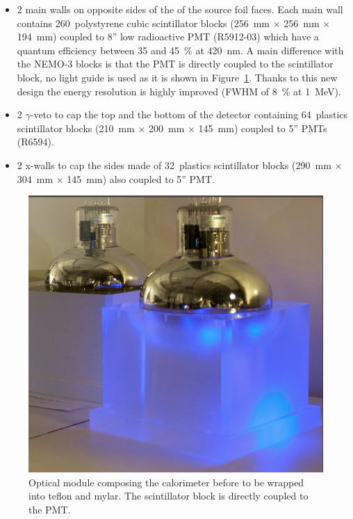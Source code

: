 \documentclass[main.tex]{subfiles}
\begin{document}
\begin{itemize}

\item 2 main walls on opposite sides of the of the source foil faces. Each main wall contains 260~polystyrene cubic scintillator  blocks (256~mm $\times$ 256~mm $\times$ 194~mm) coupled to 8'' low radioactive PMT (R5912-03) which have a quantum efficiency between 35 and 45~\% at 420~nm. A main difference with the NEMO-3 blocks is that the PMT is directly coupled to the scintillator block, no light guide is used as it is shown in Figure~\ref{SnemoOpticalModule}. Thanks to this new design the energy resolution is highly improved (FWHM of 8~\% at 1~MeV).


\item 2 $\gamma$-veto to cap the top and the bottom of the detector containing 64~plastics scintillator blocks (210~mm $\times$ 200~mm $\times$ 145~mm) coupled to 5'' PMTs (R6594). 

\item 2 x-walls to cap the sides made of 32~plastics scintillator blocks (290~mm $\times$ 304~mm $\times$ 145~mm) also coupled to 5'' PMT.

\end{itemize}


\begin{figure}[h!]
\begin{center}
\includegraphics[scale=0.25]{pictures/Chap3/calo_1.png}
\caption{Optical module composing the calorimeter before to be wrapped into teflon and mylar. The scintillator block is directly coupled to the PMT.}
\label{SnemoOpticalModule}
\end{center}
\end{figure}
\end{document}
